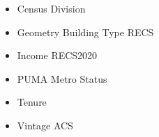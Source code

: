 \begin{itemize}
\item Census Division
\item Geometry Building Type RECS
\item Income RECS2020
\item PUMA Metro Status
\item Tenure
\item Vintage ACS
\end{itemize}
